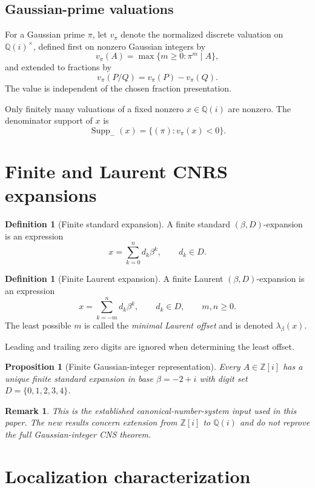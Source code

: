 \documentclass[11pt]{article}
\newtheorem{proposition}[theorem]{Proposition}
\newtheorem{remark}[theorem]{Remark}
\theoremstyle{definition}
\newtheorem{definition}[theorem]{Definition}
\newcommand{\Zi}{\mathbb{Z}[i]}
\newcommand{\Qi}{\mathbb{Q}(i)}
\newcommand{\supp}{\operatorname{Supp}}
\begin{document}
\subsection{Gaussian-prime valuations}

For a Gaussian prime $\pi$, let $v_\pi$ denote the normalized discrete valuation on $\Qi^\times$, defined first on nonzero Gaussian integers by
\[
v_\pi(A)=\max\{m\ge0:\pi^m\mid A\},
\]
and extended to fractions by
\[
v_\pi(P/Q)=v_\pi(P)-v_\pi(Q).
\]
The value is independent of the chosen fraction presentation.

Only finitely many valuations of a fixed nonzero $x\in\Qi$ are nonzero.  The denominator support of $x$ is
\[
\supp_-(x)=\{(\pi):v_\pi(x)<0\}.
\]

\section{Finite and Laurent CNRS expansions}

\begin{definition}[Finite standard expansion]
A finite standard $(\beta,D)$-expansion is an expression
\[
x=\sum_{k=0}^{n}d_k\beta^k,
\qquad d_k\in D.
\]
\end{definition}

\begin{definition}[Finite Laurent expansion]
A finite Laurent $(\beta,D)$-expansion is an expression
\[
x=\sum_{k=-m}^{n}d_k\beta^k,
\qquad d_k\in D,
\qquad m,n\ge0.
\]
The least possible $m$ is called the \emph{minimal Laurent offset} and is denoted $\lambda_\beta(x)$.
\end{definition}

Leading and trailing zero digits are ignored when determining the least offset.

\begin{proposition}[Finite Gaussian-integer representation]
Every $A\in\Zi$ has a unique finite standard expansion in base $\beta=-2+i$ with digit set $D=\{0,1,2,3,4\}$.
\end{proposition}

\begin{remark}
This is the established canonical-number-system input used in this paper.  The new results concern extension from $\Zi$ to $\Qi$ and do not reprove the full Gaussian-integer CNS theorem.
\end{remark}

\section{Localization characterization}
\end{document}
